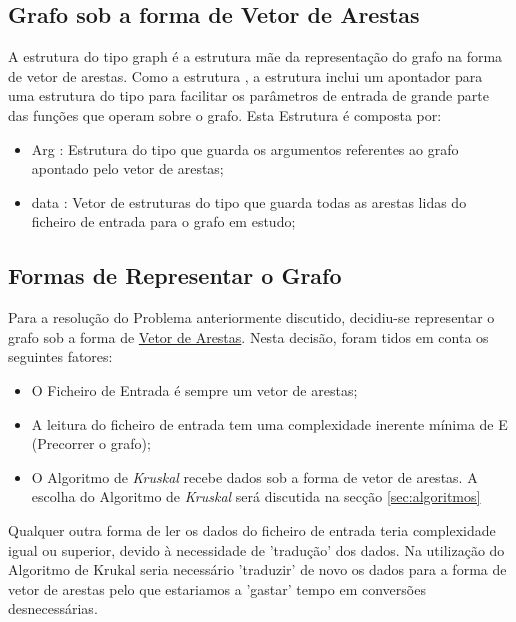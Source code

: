 \documentclass[14pt]{article}
\begin{document}
    \subsection[graph]{Grafo sob a forma de Vetor de Arestas}\label{subsec:grafo.v.are}
    A estrutura do tipo graph é a estrutura mãe da representação do grafo na forma de vetor de arestas.
    Como a estrutura , a estrutura  inclui um apontador para uma estrutura
    do tipo  para facilitar os parâmetros de entrada de grande parte das funções que operam
    sobre o grafo.
    Esta Estrutura é composta por:
    \begin{itemize}
        \item Arg : Estrutura do tipo  que guarda os argumentos referentes ao grafo apontado pelo vetor de arestas;
        \item data : Vetor de estruturas do tipo  que guarda todas as arestas lidas do ficheiro de entrada para o grafo em estudo;
    \end{itemize}

    \subsection[represent]{Formas de Representar o Grafo}\label{subsec:formas.representar.grafo}
    Para a resolução do Problema anteriormente discutido, decidiu-se representar o grafo sob a forma de \underline{Vetor de Arestas}.
    Nesta decisão, foram tidos em conta os seguintes fatores:
    \begin{itemize}
        \item O Ficheiro de Entrada é sempre um vetor de arestas;
        \item A leitura do ficheiro de entrada tem uma complexidade inerente mínima de E (Precorrer o grafo);
        \item O Algoritmo de \emph{Kruskal} recebe dados sob a forma de vetor de arestas. A escolha do Algoritmo de \emph{Kruskal} será discutida na secção \ref{sec:algoritmos}
    \end{itemize}

    Qualquer outra forma de ler os dados do ficheiro de entrada teria complexidade igual ou superior, devido à necessidade de 'tradução'
    dos dados. Na utilização do Algoritmo de Krukal seria necessário 'traduzir' de novo os dados para a forma de vetor de arestas pelo que
    estariamos a 'gastar' tempo em conversões desnecessárias.
\end{document}
